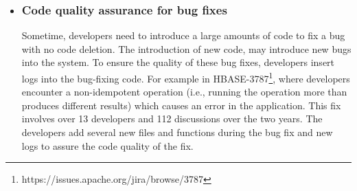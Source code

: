 \begin{itemize}
\item \subsubsection*{Code quality assurance for bug fixes} Sometime, developers need to introduce a large amounts of code to fix a bug with no code deletion. The introduction of new code, may introduce new bugs into the system. To ensure the quality of these bug fixes, developers insert logs into the bug-fixing code. For example in HBASE-3787\footnote{https://issues.apache.org/jira/browse/3787}, where developers encounter a non-idempotent operation (i.e., running the operation more than produces different results) which causes an error in the application. This fix involves over 13 developers and 112 discussions over the two years. The developers add several new files and functions during the bug fix and new logs to assure the code quality of the fix. 

\end{itemize}
